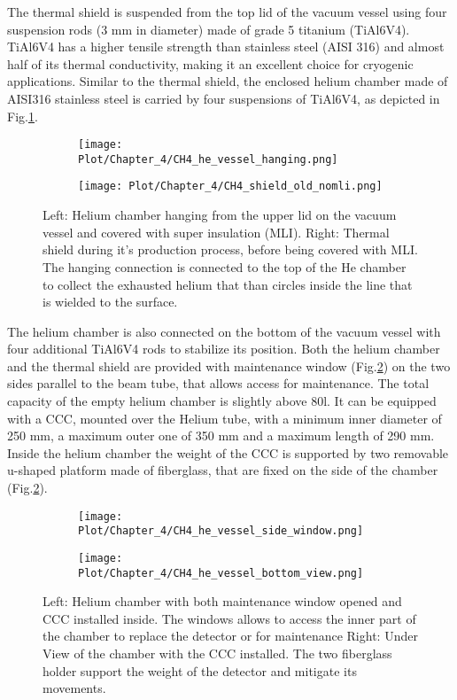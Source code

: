 \documentclass[12pt,a4paper]{report}
\begin{document}
       The thermal shield is suspended from the top lid of the vacuum vessel using four suspension rods (3 mm in diameter) made of grade 5 titanium (TiAl6V4). TiAl6V4 has a higher tensile strength than stainless steel (AISI 316) and almost half of its thermal conductivity, making it an excellent choice for cryogenic applications. Similar to the thermal shield, the enclosed helium chamber made of AISI316 stainless steel is carried by four suspensions of TiAl6V4, as depicted in Fig.\ref{CH4_Shield_old}.
       \begin{figure}[H]
       	\begin{subfigure}[b]{0.35\textwidth}
       		\centering
       		\texttt{[image: Plot/Chapter\_4/CH4\_he\_vessel\_hanging.png]}
       	\end{subfigure}
       	\hfill
       	\begin{subfigure}[b]{0.55\textwidth}
       		\centering
       		\texttt{[image: Plot/Chapter\_4/CH4\_shield\_old\_nomli.png]}
       	\end{subfigure}
       	\caption{\small{Left: Helium chamber hanging from the upper lid on the vacuum vessel and covered with super insulation (MLI). Right: Thermal shield during it's production process, before being covered with MLI. The hanging connection is connected to the top of the He chamber to collect the exhausted helium that than circles inside the line that is wielded to the surface.}}
       	\label{CH4_Shield_old}
       \end{figure}
       The helium chamber is also connected on the bottom of the vacuum vessel with four additional TiAl6V4 rods to stabilize its position. Both the helium chamber and the thermal shield are provided with maintenance window (Fig.\ref{CH4_He_vessel_window}) on the two sides parallel to the beam tube, that allows access for maintenance. The total capacity of the empty helium chamber is slightly above 80l. It can be equipped with a CCC, mounted over the Helium tube, with a minimum inner diameter of 250 mm, a maximum outer one of 350 mm and a maximum length of 290 mm. Inside the helium chamber the weight of the CCC is supported by two removable u-shaped platform made of fiberglass, that are fixed on the side of the chamber (Fig.\ref{CH4_He_vessel_window}). 
       \begin{figure}[H]
       	\begin{subfigure}[b]{0.5\textwidth}
       		\centering
       		\texttt{[image: Plot/Chapter\_4/CH4\_he\_vessel\_side\_window.png]}
       	\end{subfigure}
       	\hfill
       	\begin{subfigure}[b]{0.5\textwidth}
       		\centering
       		\texttt{[image: Plot/Chapter\_4/CH4\_he\_vessel\_bottom\_view.png]}
       	\end{subfigure}
       	\caption{\small{Left: Helium chamber with both maintenance window opened and CCC installed inside. The windows allows to access the inner part of the chamber to replace the detector or for maintenance Right: Under View of the chamber with the CCC installed. The two fiberglass holder support the weight of the detector and mitigate its movements.}}
       	\label{CH4_He_vessel_window}
       \end{figure}
\end{document}
